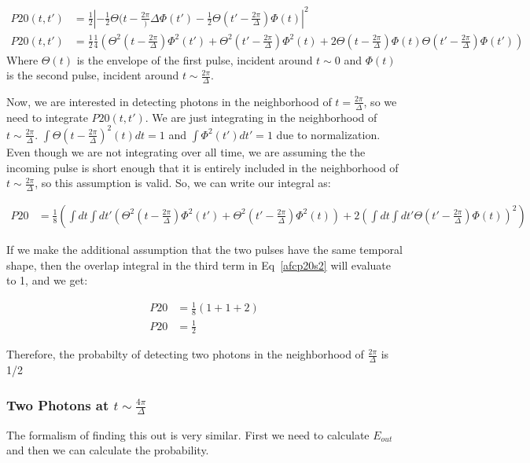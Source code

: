 \documentclass[12pt]{article}
\begin{document}
\begin{align}
P20(t,t') &= \frac{1}{2}\left|- \frac{1}{2}\Theta(t-\frac{2 \pi}){\Delta}\Phi(t') -\frac{1}{2} \Theta(t'-\frac{2 \pi}{\Delta})\Phi(t)\right|^2\\
P20(t,t') &= \frac{1}{2} \frac{1}{4} \left ( \Theta^2(t-\frac{2 \pi}{\Delta})\Phi^2(t')+\Theta^2(t'-\frac{2 \pi}{\Delta})\Phi^2(t)+2\Theta(t-\frac{2 \pi}{\Delta}) \Phi(t) \Theta(t'-\frac{2 \pi}{\Delta}) \Phi(t')\right)
\end{align}
Where $\Theta(t)$ is the envelope of the first pulse, incident around $t\sim 0$ and $\Phi(t)$ is the second pulse, incident around $t\sim \frac{2 \pi}{\Delta}$.


Now, we are interested in detecting photons in the neighborhood of $t =\frac{2 \pi}{\Delta}$, so we need to integrate $P20(t,t')$. We are just integrating in the neighborhood of $t\sim \frac{2 \pi}{\Delta}$. $\int \Theta(t-\frac{2 \pi}{\Delta})^2(t) dt =1 $ and $\int \Phi^2(t') dt' =1$ due to normalization. Even though we are not integrating over all time,
we are assuming the the incoming pulse is short enough that it is entirely included in the neighborhood of $t\sim \frac{2 \pi}{\Delta}$, so this assumption is valid. So, we can write our integral as:

\begin{align}
\label{afcp20s2}
P20 &= \frac{1}{8}\left(\int dt \int dt' 
 \left ( \Theta^2(t-\frac{2 \pi}{\Delta})\Phi^2(t')+\Theta^2(t'-\frac{2 \pi}{\Delta})\Phi^2(t)\right)+2\left(\int dt \int dt' \Theta(t'-\frac{2 \pi}{\Delta}) \Phi(t)\right)^2\right)
\end{align}

If we make the additional assumption that the two pulses have the same temporal shape, then the overlap integral in the third term in Eq~\eqref{afcp20s2} will evaluate to 1, and we get:

\begin{align}
\label{afcp20}
P20 &= \frac{1}{8} \left( 1+1 +2\right)\\
P20 &= \frac{1}{2}
\end{align}

Therefore, the probabilty of detecting two photons in the neighborhood of $\frac{2 \pi}{\Delta}$ is 1/2

\subsubsection{ Two Photons at $t\sim \frac{4\pi}{\Delta}$}
\label{sec:afcp02}
The formalism of finding this out is very similar. First we need to calculate $E_{out}$ and then we can 
calculate the probability.
\end{document}
